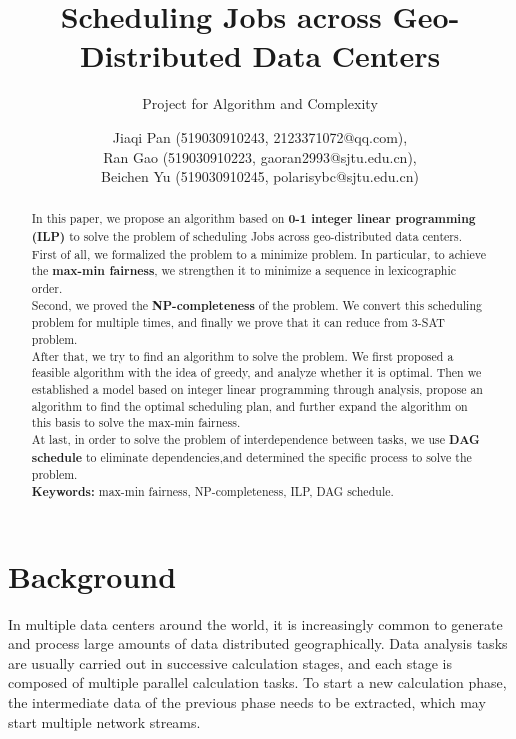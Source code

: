 \documentclass{llncs}
\title{Scheduling Jobs across Geo-Distributed Data Centers}
\subtitle{Project for Algorithm and Complexity \vspace{-3mm}}
\author{Jiaqi Pan (519030910243, 2123371072@qq.com), \\Ran Gao (519030910223, gaoran2993@sjtu.edu.cn), \\Beichen Yu (519030910245, polarisybc@sjtu.edu.cn)}
\institute{Shanghai Jiao Tong University, Shanghai, China}
\begin{document}



\maketitle
\begin{abstract}\vspace{-5mm}
    In this paper, we propose an algorithm based on \textbf{0-1 integer linear programming (ILP)} to solve the problem of scheduling Jobs across geo-distributed data centers. ~\\

    First of all, we formalized the problem to a minimize problem. In particular, to achieve the \textbf{max-min fairness}, we strengthen it to minimize a sequence in lexicographic order.~\\
    
    Second, we proved the \textbf{NP-completeness} of the problem. We convert this scheduling problem for multiple times, and finally we prove that it can reduce from 3-SAT problem.~\\
    
    After that, we try to find an algorithm to solve the problem. We first proposed a feasible algorithm with the idea of greedy, and analyze whether it is optimal. Then we established a model based on integer linear programming through analysis, propose an algorithm to find the optimal scheduling plan, and further expand the algorithm on this basis to solve the max-min fairness.~\\
    
    At last, in order to solve the problem of interdependence between tasks, we use \textbf{DAG schedule} to eliminate dependencies,and determined the specific process to solve the problem.    ~\\

\textbf{Keywords:} max-min fairness, NP-completeness, ILP, DAG schedule.
\end{abstract}

\section{Background}

In multiple data centers around the world, it is increasingly common to generate and process large amounts of data distributed geographically. Data analysis tasks are usually carried out in successive calculation stages, and each stage is composed of multiple parallel calculation tasks. To start a new calculation phase, the intermediate data of the previous phase needs to be extracted, which may start multiple network streams.
\end{document}
